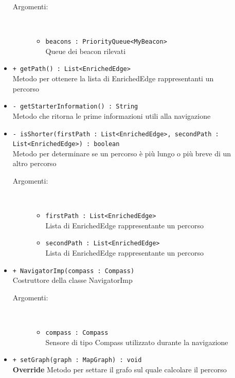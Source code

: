\documentclass[../DefinizioneDiProdotto.tex]{subfiles}
\begin{document}
\begin{description}
\begin{itemize}
 \begin{description}
\item[Argomenti:] \
\begin{itemize}
\item \texttt{beacons : PriorityQueue<MyBeacon>}\\
Queue dei beacon rilevati\end{itemize}
\end{description}
\item \texttt{+ getPath() : List<EnrichedEdge>}\\
Metodo per ottenere la lista di EnrichedEdge rappresentanti un percorso
 \item \texttt{- getStarterInformation() : String}\\
Metodo che ritorna le prime informazioni utili alla navigazione
 \item \texttt{- isShorter(firstPath : List<EnrichedEdge>, secondPath : List<EnrichedEdge>) : boolean}\\
Metodo per determinare se un percorso è più lungo o più breve di un altro percorso
 \begin{description}
\item[Argomenti:] \
\begin{itemize}
\item \texttt{firstPath : List<EnrichedEdge>}\\
Lista di EnrichedEdge rappresentante un percorso\item \texttt{secondPath : List<EnrichedEdge>}\\
Lista di EnrichedEdge rappresentante un percorso\end{itemize}
\end{description}
\item \texttt{+ NavigatorImp(compass : Compass)}\\
Costruttore della classe NavigatorImp
 \begin{description}
\item[Argomenti:] \
\begin{itemize}
\item \texttt{compass : Compass}\\
Sensore di tipo Compass utilizzato durante la navigazione\end{itemize}
\end{description}
\item \texttt{+ setGraph(graph : MapGraph) : void}\\
\textbf{Override} Metodo per settare il grafo sul quale calcolare il percorso
 \begin{description}

\end{description}
\end{itemize}
\end{description}
\end{document}
